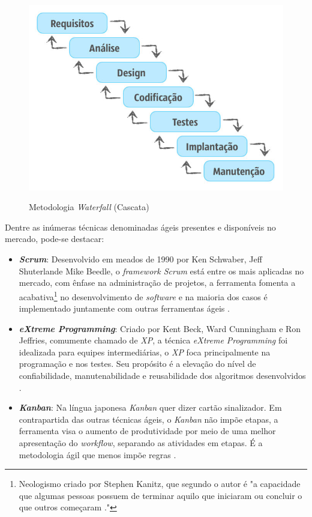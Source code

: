 \FloatBarrier
\begin{figure}[!htbp]
	\centering
		\caption{Metodologia \textit{Waterfall} (Cascata)} 
	\includegraphics[scale=0.4]{imagens/CASCATA}
	\label{fig:figura1}
\end{figure}
\FloatBarrier

Dentre as inúmeras técnicas denominadas ágeis presentes e disponíveis no mercado, pode-se destacar:

\begin{itemize}
\item{\textbf{\textit{Scrum}}}: Desenvolvido em meados de 1990 por Ken Schwaber, Jeff Shuterlande Mike Beedle, o \textit{framework Scrum} está entre os mais aplicadas no mercado, com ênfase na administração de projetos, a ferramenta fomenta a acabativa\footnote{Neologismo criado por Stephen Kanitz, que segundo o autor é "a capacidade que algumas pessoas possuem de terminar aquilo que iniciaram ou concluir o que outros começaram \cite{Acabativa}."} no desenvolvimento de \textit{software} e na maioria dos casos é implementado juntamente com outras ferramentas ágeis \cite{wildt2015extreme}. 
\item{\textbf{\textit{eXtreme Programming}}}: Criado por Kent Beck, Ward Cunningham e Ron Jeffries, comumente chamado de \textit{XP}, a técnica \textit{eXtreme Programming} foi idealizada para equipes intermediárias, o \textit{XP} foca principalmente na programação e nos testes. Seu propósito é a elevação do nível de confiabilidade, manutenabilidade e reusabilidade dos algoritmos desenvolvidos \cite{wildt2015extreme}.

\item{\textbf{\textit{Kanban}}}:
Na língua japonesa \textit{Kanban} quer dizer cartão sinalizador. Em contrapartida das outras técnicas ágeis, o \textit{Kanban} não impõe etapas, a ferramenta visa o aumento de produtividade por meio de uma melhor apresentação do \textit{workflow}, separando as atividades em etapas. É a metodologia ágil que menos impõe regras \cite{gomes2014agile}.
\end{itemize}

